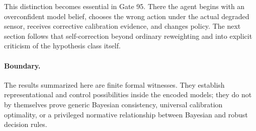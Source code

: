 This distinction becomes essential in Gate 95. There the agent begins with an overconfident model belief, chooses the wrong action under the actual degraded sensor, receives corrective calibration evidence, and changes policy. The next section follows that self-correction beyond ordinary reweighting and into explicit criticism of the hypothesis class itself.

\paragraph{Boundary.}
The results summarized here are finite formal witnesses. They establish representational and control possibilities inside the encoded models; they do not by themselves prove generic Bayesian consistency, universal calibration optimality, or a privileged normative relationship between Bayesian and robust decision rules.
